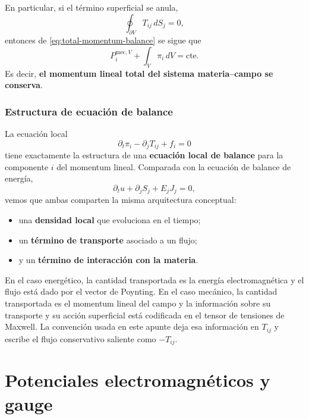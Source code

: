 \documentclass[12pt,a4paper]{article}
\theoremstyle{definition}
\theoremstyle{plain}
\numberwithin{equation}{section}
\theoremstyle{remark}
\begin{document}
En particular, si el término superficial se anula,
\begin{equation}
    \oint_{\partial V}T_{ij}\,dS_j=0,
    \label{eq:zero-surface-stress}
\end{equation}
entonces de \eqref{eq:total-momentum-balance} se sigue que
\begin{equation}
    P_i^{\mathrm{mec},V}
    +
    \int_V \pi_i\,dV
    =
    \mathrm{cte}.
    \label{eq:momentum-conservation-total}
\end{equation}
Es decir, \textbf{el momentum lineal total del sistema materia--campo se conserva}.

\subsubsection*{Estructura de ecuación de balance}

La ecuación local
\begin{equation}
    \partial_t\pi_i-\partial_jT_{ij}+f_i=0
    \label{eq:momentum-balance-final}
\end{equation}
tiene exactamente la estructura de una \textbf{ecuación local de balance} para la componente $i$ del momentum lineal. Comparada con la ecuación de balance de energía,
\begin{equation}
    \partial_tu+\partial_jS_j+E_jJ_j=0,
    \label{eq:energy-balance-compact-reminder}
\end{equation}
vemos que ambas comparten la misma arquitectura conceptual:

\begin{itemize}
    \item una \textbf{densidad local} que evoluciona en el tiempo;
    \item un \textbf{término de transporte} asociado a un flujo;
    \item y un \textbf{término de interacción con la materia}.
\end{itemize}

En el caso energético, la cantidad transportada es la energía electromagnética y el flujo está dado por el vector de Poynting. En el caso mecánico, la cantidad transportada es el momentum lineal del campo y la información sobre su transporte y su acción superficial está codificada en el tensor de tensiones de Maxwell. La convención usada en este apunte deja esa información en $T_{ij}$ y escribe el flujo conservativo saliente como $-T_{ij}$.

\newpage


\section{Potenciales electromagnéticos y gauge}
\end{document}
